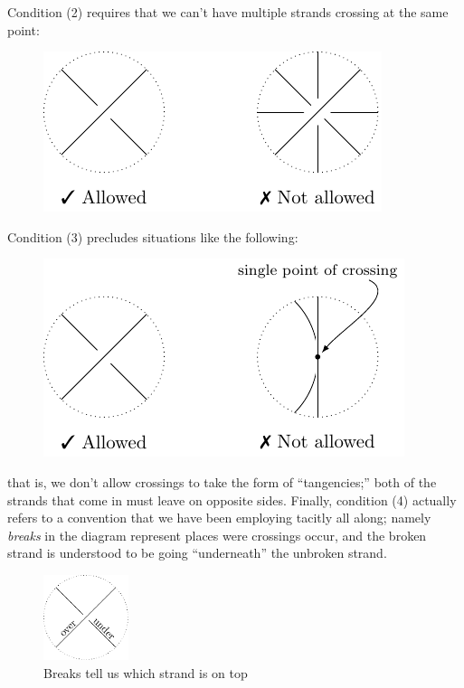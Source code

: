 Condition (2) requires that we can't have multiple strands crossing at
the same point: %
\begin{figure}[H]
  \centering
  \includegraphics{figures/background/single_cross.pdf}
\end{figure}
Condition (3) precludes situations like the following:
\begin{figure}[H]
  \centering
  \includegraphics{figures/background/x_cross.pdf}
\end{figure}
that is, we don't allow crossings to take the form of ``tangencies;''
both of the strands that come in must leave on opposite sides.
Finally, condition (4) actually refers to a convention that we have
been employing tacitly all along; namely \emph{breaks} in the diagram
represent places were crossings occur, and the broken strand is
understood to be going ``underneath'' the unbroken strand.
\begin{figure}[H]
  \begin{center}
    \includegraphics[width=2.5cm]{figures/background/uo_cross.pdf}
  \end{center}
  \caption{Breaks tell us which strand is on top}
\end{figure}
